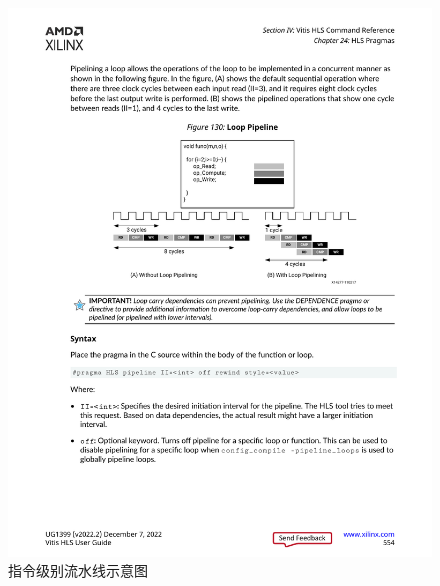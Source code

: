 \begin{figure}[htbp]
    \centering
    \includegraphics[width=\linewidth]{figures/pragma_pipeline.pdf}
    \caption{指令级别流水线示意图}
    \label{fig:pragma_pipeline}
\end{figure}
